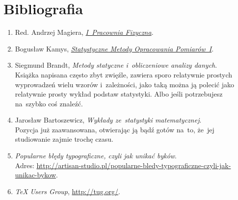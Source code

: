 \documentclass[a4paper,11pt]{article}
\begin{document}
\section*{Bibliografia}

\begin{enumerate}
\item Red. Andrzej Magiera,
  \href{http://www.1pf.if.uj.edu.pl/documents/5046939/5227638/skrypt.pdf}{\emph{I~Pracownia
      Fizyczna}}.
\item Bogusław Kamys,
  \href{http://users.uj.edu.pl/\~ufkamys/BK/smop1N\_h.pdf}{\emph{Statystyczne
      Metody Opracowania Pomiarów~I}}.
\item Siegmund Brandt, \emph{Metody statyczne i~obliczeniowe analizy
    danych}. \\
  Książka napisana często zbyt zwięźle, zawiera sporo relatywnie
  prostych wyprowadzeń wielu wzorów i~zależności, jako taką można ją
  polecić jako relatywnie prosty wykład podstaw statystyki. Albo jeśli
  potrzebujesz na~szybko coś znaleźć.
\item Jarosław Bartoszewicz, \emph{Wykłady ze~statystyki matematycznej}. \\
  Pozycja już zaawansowana, otwierając ją bądź gotów na~to, że~jej
  studiowanie zajmie trochę czasu.
\item \emph{Popularne
    błędy typograficzne, czyli jak unikać byków}. \\
  Adres:
  \href{http://artisan-studio.pl/popularne-bledy-typograficzne-czyli-jak-unikac-bykow}{http://artisan-studio.pl/popularne-bledy-typograficzne-czyli-jak-unikac-bykow}.
\item \emph{\TeX{} Users Group},
  \href{http://tug.org/}{http://tug.org/}.
\end{enumerate}






\end{document}
